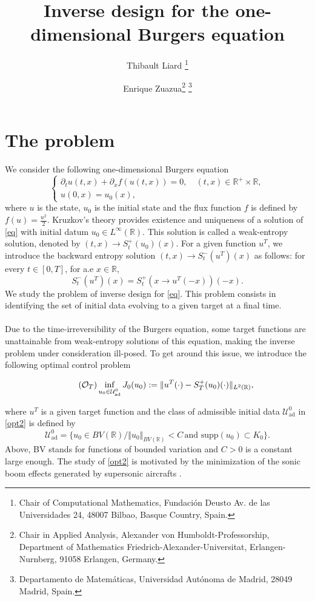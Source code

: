 \documentclass{article}
\title{Inverse design for the one-dimensional Burgers equation}
\author{
Thibault Liard%
 \footnote{Chair of Computational Mathematics, Fundaci\'on Deusto Av. de las Universidades 24, 48007 Bilbao, Basque Country, Spain.}
\and
Enrique Zuazua\footnotemark[\value{footnote}] \footnote{Chair in Applied Analysis, Alexander von Humboldt-Professorship, Department of Mathematics Friedrich-Alexander-Universitat, Erlangen-Nurnberg, 91058 Erlangen, Germany.} \footnote{Departamento de Matem\'aticas, Universidad Aut\'onoma de Madrid, 28049 Madrid, Spain.}%
}
\date{}
\newcommand{\R}{\mathbb R}
\begin{document}
\maketitle





\section{The problem}

We consider the following one-dimensional Burgers equation 
\begin{equation} \label{eq} \left\{ \begin{array}{l}
\partial_t u(t,x)+\partial_x f(u(t,x))=0, \quad (t,x)\in \R^+ \times \R, \\
u(0,x)=u_0(x),
\end{array}\right.
\end{equation}
where $u$ is the state, $u_0$ is the initial state and  the flux function $f$ is defined by $f(u)=\frac{u^2}{2}$. Kruzkov's theory \cite{Kru70} provides existence and uniqueness of a  solution  of \eqref{eq} with initial datum $u_0 \in L^{\infty}(\mathbb R)$. This solution is called a weak-entropy solution, denoted by $(t,x) \to S_t^+(u_0)(x)$. For a given function $u^T$, we introduce the backward entropy  solution $(t,x) \to S^-_{t}(u^T)(x)$  as follows: 
for every $t\in [0,T]$, for a.e $x\in \mathbb R$,  
$$S^-_{t}(u^T)(x)= S^+_{t}(x\to u^T(-x))(-x).$$
We study the problem of inverse design for \eqref{eq}. This problem consists in  identifying the set of initial data evolving to a given target at a final time.  \ \\
 \ \\
Due to the time-irreversibility of the Burgers equation, some target functions are unattainable from weak-entropy solutions of this equation, making the inverse problem under consideration ill-posed. To get around this issue, we introduce the following  optimal control problem 

\begin{equation} \tag{$\mathcal{O}_T$}\label{opt2} \inf_{u_0\in \mathcal{U}^0_{\text{ad}}} J_0(u_0):=\Vert u^T(\cdot)-S_T^+(u_0)(\cdot)\Vert_{L^2(\mathbb R)},\end{equation}

where $u^T$ is a given target function and the class of admissible initial data $\mathcal{U}^0_{\text{ad}}$ in \eqref{opt2} is defined by 
\begin{equation} \label{admissible_set}\mathcal{U}^0_{\text{ad}}=\{u_0\in BV(\mathbb R) \slash \Vert u_0 \Vert_{BV( \mathbb R)} < C \,  \text{and } \text{supp}(u_0)\subset K_0\}.\end{equation}
Above, BV stands for functions of bounded variation and  $C>0$ is a constant large enough. The study of \eqref{opt2} is motivated by the minimization of the sonic boom effects generated by supersonic aircrafts \cite{Cle95,AC12,APZ16b}.  \ \\
\end{document}
